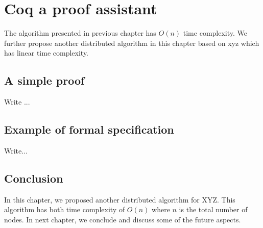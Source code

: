 \chapter{Coq a proof assistant}

The algorithm presented in previous chapter has $O(n)$ time 
complexity. We further propose another
distributed algorithm in this chapter based on xyz which has linear time 
complexity.

\section{A simple proof}

Write ...

\section{Example of formal specification}

Write...

\section{Conclusion}
In this chapter, we proposed another distributed algorithm for
XYZ. This algorithm has both time complexity of $O(n)$ where $n$
is the total number of nodes.  In next chapter, we conclude and
discuss some of the future aspects.

